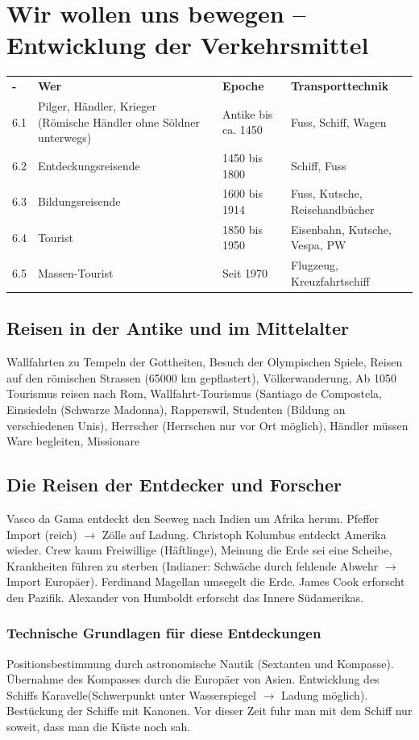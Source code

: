 \documentclass[10pt, openright=true]{scrartcl}
\begin{document}
\section{Wir wollen uns bewegen – Entwicklung der Verkehrsmittel}
\begin{tabularx}{1\textwidth}{L{2cm} L{4cm} L{3cm} X}
 \textbf{-} & \textbf{Wer} & \textbf{Epoche} & \textbf{Transporttechnik}\\ 
6.1 & Pilger, Händler, Krieger \newline (Römische Händler ohne Söldner unterwegs) & Antike bis ca. 1450 & Fuss, Schiff, Wagen\\
 6.2 & Entdeckungsreisende & 1450 bis 1800 & Schiff, Fuss\\
6.3 & Bildungsreisende & 1600 bis 1914 & Fuss, Kutsche, Reisehandbücher\\
 6.4 & Tourist & 1850 bis 1950 & Eisenbahn, Kutsche, Vespa, PW\\
6.5 & Massen-Tourist & Seit 1970 & Flugzeug, Kreuzfahrtschiff\\
\end{tabularx}
\subsection{Reisen in der Antike und im Mittelalter}
Wallfahrten zu Tempeln der Gottheiten, Besuch der Olympischen Spiele, Reisen auf den römischen Strassen (65000 km gepflastert), Völkerwanderung, Ab 1050 Tourismus reisen nach Rom, Wallfahrt-Tourismus (Santiago de Compostela, Einsiedeln (Schwarze Madonna), Rapperswil, Studenten (Bildung an verschiedenen Unis), Herrscher (Herrschen nur vor Ort möglich), Händler müssen Ware begleiten, Missionare
\subsection{Die Reisen der Entdecker und Forscher}
Vasco da Gama entdeckt den Seeweg nach Indien um Afrika herum. Pfeffer Import (reich) $ \rightarrow $ Zölle auf Ladung. Christoph Kolumbus entdeckt Amerika wieder. Crew kaum Freiwillige (Häftlinge), Meinung die Erde sei eine Scheibe, Krankheiten führen zu sterben (Indianer: Schwäche durch fehlende Abwehr $ \rightarrow $ Import Europäer). Ferdinand Magellan umsegelt die Erde. James Cook erforscht den Pazifik. Alexander von Humboldt erforscht das Innere Südamerikas.
\subsubsection{Technische Grundlagen für diese Entdeckungen}
Positionsbestimmung durch astronomische Nautik (Sextanten und Kompasse). Übernahme des Kompasses durch die Europäer von Asien. Entwicklung des Schiffs \glqq Karavelle\grqq (Schwerpunkt unter Wasserspiegel $ \rightarrow $ Ladung möglich). Bestückung der Schiffe mit Kanonen. Vor dieser Zeit fuhr man mit dem Schiff nur soweit, dass man die Küste noch sah.
\end{document}
